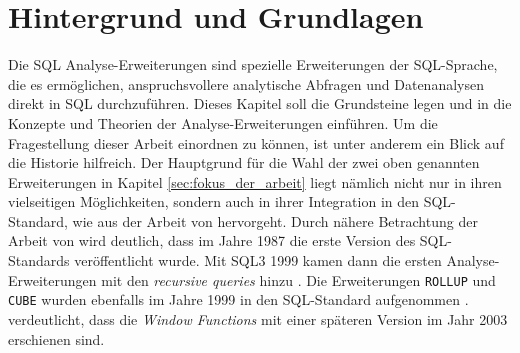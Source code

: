 \chapter{Hintergrund und Grundlagen}
\label{chap:hintergund_und_grundlagen} Die SQL Analyse-Erweiterungen sind spezielle
Erweiterungen der SQL-Sprache, die es ermöglichen, anspruchsvollere analytische Abfragen
und Datenanalysen direkt in SQL durchzuführen. Dieses Kapitel soll die Grundsteine legen und in die
Konzepte und Theorien der Analyse-Erweiterungen einführen. Um die Fragestellung
dieser Arbeit einordnen zu können, ist unter anderem ein Blick auf die Historie hilfreich.
Der Hauptgrund für die Wahl der zwei oben genannten Erweiterungen in Kapitel
\ref{sec:fokus_der_arbeit} liegt nämlich nicht nur in ihren vielseitigen
Möglichkeiten, sondern auch in ihrer Integration in den SQL-Standard, wie aus
der Arbeit von \citet[S.~10]{grust2017advanced} hervorgeht. Durch nähere
Betrachtung der Arbeit von \cite{grust2017advanced} wird deutlich, dass im Jahre
1987 die erste Version des SQL-Standards veröffentlicht wurde. Mit SQL3 1999
kamen dann die ersten Analyse-Erweiterungen mit den \textit{recursive queries} hinzu
\citep[S.~10]{grust2017advanced}. Die Erweiterungen \texttt{ROLLUP} und \texttt{CUBE}
wurden ebenfalls im Jahre 1999 in den SQL-Standard aufgenommen \citep[Kapitel 9.12]{melton2001sql}.
\citet[S.~10]{grust2017advanced} verdeutlicht, dass die \textit{Window Functions}
mit einer späteren Version im Jahr 2003 erschienen sind.

